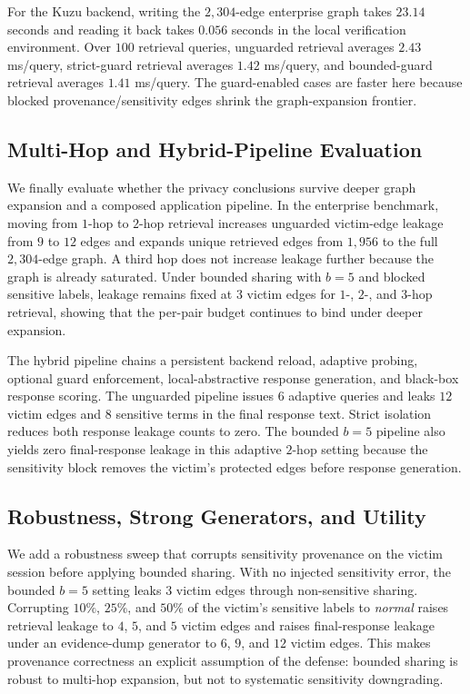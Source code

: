 \documentclass[journal,10pt,twocolumn]{IEEEtran}
\begin{document}
For the Kuzu backend, writing the $2,304$-edge enterprise graph takes
$23.14$ seconds and reading it back takes $0.056$ seconds in the local
verification environment. Over $100$ retrieval queries, unguarded
retrieval averages $2.43$ ms/query, strict-guard retrieval averages
$1.42$ ms/query, and bounded-guard retrieval averages $1.41$ ms/query.
The guard-enabled cases are faster here because blocked
provenance/sensitivity edges shrink the graph-expansion frontier.

\subsection{Multi-Hop and Hybrid-Pipeline Evaluation}
We finally evaluate whether the privacy conclusions survive deeper
graph expansion and a composed application pipeline. In the
enterprise benchmark, moving from $1$-hop to $2$-hop retrieval
increases unguarded victim-edge leakage from $9$ to $12$ edges and
expands unique retrieved edges from $1,956$ to the full $2,304$-edge
graph. A third hop does not increase leakage further because the graph
is already saturated. Under bounded sharing with $b{=}5$ and blocked
sensitive labels, leakage remains fixed at $3$ victim edges for
$1$-, $2$-, and $3$-hop retrieval, showing that the per-pair budget
continues to bind under deeper expansion.

The hybrid pipeline chains a persistent backend reload, adaptive
probing, optional guard enforcement, local-abstractive response
generation, and black-box response scoring. The unguarded pipeline
issues $6$ adaptive queries and leaks $12$ victim edges and $8$
sensitive terms in the final response text. Strict isolation reduces
both response leakage counts to zero. The bounded $b{=}5$ pipeline
also yields zero final-response leakage in this adaptive $2$-hop
setting because the sensitivity block removes the victim's protected
edges before response generation.

\subsection{Robustness, Strong Generators, and Utility}
We add a robustness sweep that corrupts sensitivity provenance on the
victim session before applying bounded sharing. With no injected
sensitivity error, the bounded $b{=}5$ setting leaks $3$ victim edges
through non-sensitive sharing. Corrupting $10\%$, $25\%$, and $50\%$
of the victim's sensitive labels to \textit{normal} raises retrieval
leakage to $4$, $5$, and $5$ victim edges and raises final-response
leakage under an evidence-dump generator to $6$, $9$, and $12$ victim
edges. This makes provenance correctness an explicit assumption of
the defense: bounded sharing is robust to multi-hop expansion, but
not to systematic sensitivity downgrading.
\end{document}
